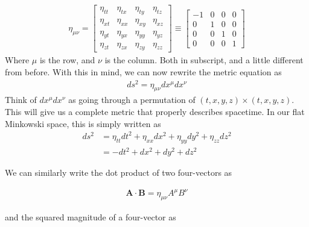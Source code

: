 \documentclass[12pt]{book}
\begin{document}
\begin{align}
\eta_{\mu\nu}=
\begin{bmatrix}
    \eta_{tt} & \eta_{tx} & \eta_{ty} & \eta_{tz} \\
    \eta_{xt} & \eta_{xx} & \eta_{xy} & \eta_{xz} \\
    \eta_{yt} & \eta_{yx} & \eta_{yy} & \eta_{yz} \\
    \eta_{zt} & \eta_{zx} & \eta_{zy} & \eta_{zz}
\end{bmatrix}
\equiv
\begin{bmatrix}
    -1 & 0 & 0 & 0 \\
     0 & 1 & 0 & 0 \\
     0 & 0 & 1 & 0 \\
     0 & 0 & 0 & 1
\end{bmatrix}
\end{align}
Where $\mu$ is the row, and $\nu$ is the column. Both in subscript, and a little different from before. With this in mind, we can now rewrite the metric equation as
\begin{align}
ds^2 = \eta_{\mu\nu}dx^{\mu}dx^{\nu}
\end{align}
Think of $dx^{\mu}dx^{\nu}$ as going through a permutation of $(t,x,y,z)\times(t,x,y,z)$. This will give us a complete metric that properly describes spacetime. In our flat Minkowski space, this is simply written as
\begin{align}
ds^2 &= \eta_{tt} dt^2 + \eta_{xx} dx^2 + \eta_{yy} dy^2 + \eta_{zz} dz^2 \nonumber \\
     &= -dt^2 + dx^2 + dy^2 + dz^2
\end{align}

We can similarly write the dot product of two four-vectors as

\begin{align}
\mathbf{A} \cdot \mathbf{B} = \eta_{\mu \nu} A^\mu B^\nu
\end{align}

and the squared magnitude of a four-vector as
\end{document}
